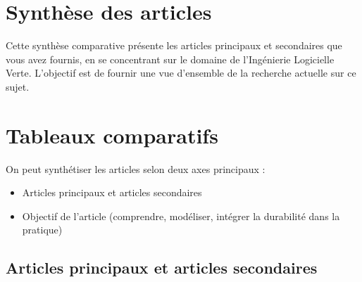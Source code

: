 \section{Synthèse des articles}
Cette synthèse comparative présente les articles principaux et secondaires que vous avez fournis, en se concentrant sur le domaine de l'Ingénierie Logicielle Verte. L'objectif est de fournir une vue d'ensemble de la recherche actuelle sur ce sujet.

\section{Tableaux comparatifs}

On peut synthétiser les articles selon deux axes principaux :

\begin{itemize}
    \item Articles principaux et articles secondaires
    \item Objectif de l'article (comprendre, modéliser, intégrer la durabilité dans la pratique)
\end{itemize}

\subsection{Articles principaux et articles secondaires}

